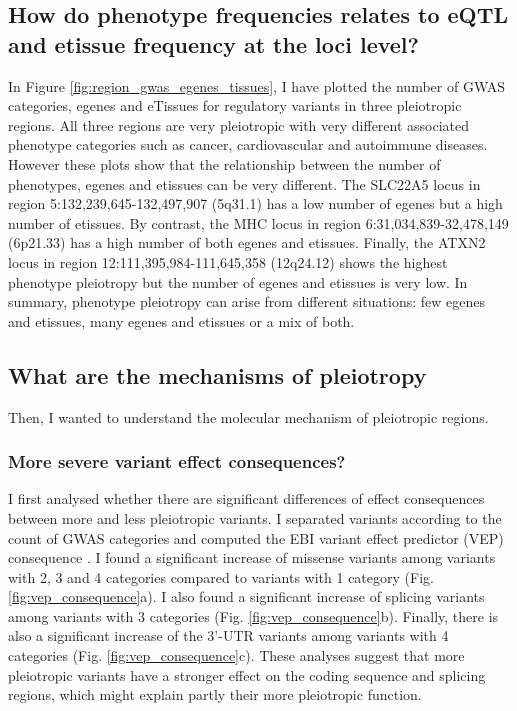 \subsection*{How do phenotype frequencies relates to eQTL and etissue frequency at the loci level?}

In Figure \ref{fig:region_gwas_egenes_tissues}, I have plotted the number of GWAS categories, egenes and eTissues for regulatory variants in three pleiotropic regions.
%
All three regions are very pleiotropic with very different associated phenotype categories such as cancer, cardiovascular and autoimmune diseases.
%
However these plots show that the relationship between the number of phenotypes, egenes and etissues can be very different.
%
The SLC22A5 locus in region 5:132,239,645-132,497,907 (5q31.1) has a low number of egenes but a high number of etissues.
%
By contrast, the MHC locus in region 6:31,034,839-32,478,149 (6p21.33) has a high number of both egenes and etissues.
%
Finally, the ATXN2 locus in region 12:111,395,984-111,645,358 (12q24.12) shows the highest phenotype pleiotropy but the number of egenes and etissues is very low.
%
In summary, phenotype pleiotropy can arise from different situations: few egenes and etissues, many egenes and etissues or a mix of both.

\subsection*{What are the mechanisms of pleiotropy}

Then, I wanted to understand the molecular mechanism of pleiotropic regions.

\subsubsection*{More severe variant effect consequences?}

I first analysed whether there are significant differences of effect consequences between more and less pleiotropic variants.
%
I separated variants according to the count of GWAS categories and computed the EBI variant effect predictor (VEP) consequence \citep{2016.Cunningham.McLaren}.
%
I found a significant increase of missense variants among variants with 2, 3 and 4 categories compared to variants with 1 category (Fig. \ref{fig:vep_consequence}a).
%
I also found a significant increase of splicing variants among variants with 3 categories (Fig. \ref{fig:vep_consequence}b).
%
Finally, there is also a significant increase of the 3'-UTR variants among variants with 4 categories (Fig. \ref{fig:vep_consequence}c).
%
These analyses suggest that more pleiotropic variants have a stronger effect on the coding sequence and splicing regions, which might explain partly their more pleiotropic function.

